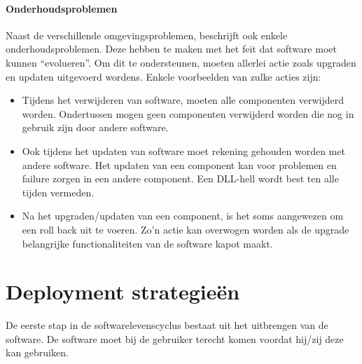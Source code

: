 \paragraph{Onderhoudsproblemen}
Naast de verschillende omgevingsproblemen, beschrijft \citet{dolstra2006purely} ook enkele onderhoudsproblemen.
Deze hebben te maken met het feit dat software moet kunnen ``evolueren''.
Om dit te ondersteunen, moeten allerlei actie zoals upgraden en updaten uitgevoerd wordens.
Enkele voorbeelden van zulke acties zijn:
\begin{itemize}
\item Tijdens het verwijderen van software, moeten alle componenten verwijderd worden.
Ondertussen mogen geen componenten verwijderd worden die nog in gebruik zijn door andere software.
\item Ook tijdens het updaten van software moet rekening gehouden worden met andere software.
Het updaten van een component kan voor problemen en failure zorgen in een andere component.
Een DLL-hell wordt best ten alle tijden vermeden.
\item Na het upgraden/updaten van een component, is het soms aangewezen om een roll back uit te voeren.
Zo'n actie kan overwogen worden als de upgrade belangrijke functionaliteiten van de software kapot maakt.
\end{itemize}

\section{Deployment strategieën}\label{sec:deployment}
De eerste stap in de softwarelevenscyclus bestaat uit het uitbrengen van de software.
De software moet bij de gebruiker terecht komen voordat hij/zij deze kan gebruiken.

